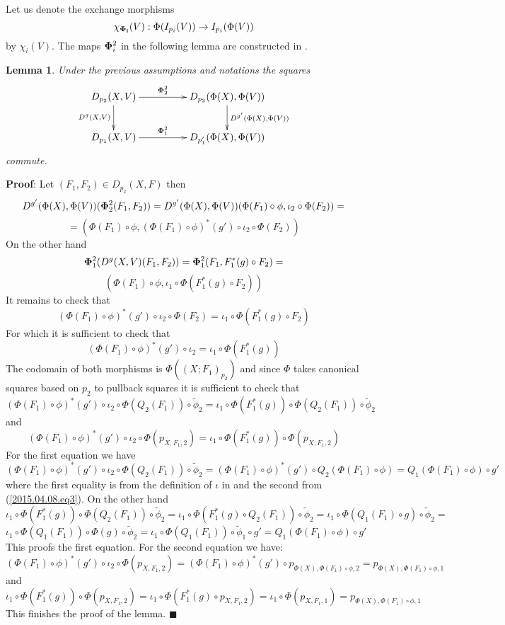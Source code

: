 \documentclass[12pt]{article}
\numberwithin{equation}{section}
\newenvironment{myproof}{{\bf Proof}:}{$\blacksquare$ \vskip 5mm }
\newtheorem{lemma}[proposition]{Lemma}
\newcommand{\llabel}[1]{\label{#1}}
\newcommand{\sr}{\rightarrow}
\newcommand{\wt}{\widetilde}
\begin{document}
%
Let us denote the exchange morphisms
%
$$\chi_{\bf\Phi_i}(V):\Phi(I_{p_i}(V))\sr I_{p_i}(\Phi(V))$$
%
by $\chi_i(V)$. The maps ${\bf\Phi}_i^2$ in the following lemma are constructed
in \cite[Construction 5.2]{fromunivwithPi}.
%
\begin{lemma}
\llabel{2015.04.08.l1} Under the previous assumptions and notations the squares
%
$$
\begin{xy}
          \xymatrix@C=4pc{ D_{p_2}(X,V) \ar[r]^-{{\bf\Phi}_2^2}
            \ar[d]_{D^g(X,V)} & D_{p_2}(\Phi(X),\Phi(V))
            \ar[d]^{D^{g'}(\Phi(X),\Phi(V))}\\ D_{p_1}(X,V)
            \ar[r]^-{{\bf\Phi}_1^2} & D_{p_1'}(\Phi(X),\Phi(V)) }
\end{xy}
$$
%
commute.
\end{lemma}
%
\begin{myproof}
Let $(F_1,F_2)\in D_{p_2}(X,F)$ then
%
$$D^{g'}(\Phi(X),\Phi(V))({\bf\Phi}_2^2(F_1,F_2))=D^{g'}(\Phi(X),\Phi(V))(\Phi(F_1)\circ
\phi, \iota_2\circ \Phi(F_2))=$$
$$=(\Phi(F_1)\circ \phi, (\Phi(F_1)\circ \phi)^*(g')\circ \iota_2\circ
\Phi(F_2))$$
%
On the other hand
%
$${\bf\Phi}_1^2(D^g(X,V)(F_1,F_2))={\bf\Phi}_1^2(F_1,F_1^*(g)\circ F_2)=$$
$$(\Phi(F_1)\circ\phi,\iota_1\circ \Phi(F_1^*(g)\circ F_2))$$
%
It remains to check that
%
$$(\Phi(F_1)\circ \phi)^*(g')\circ \iota_2\circ \Phi(F_2)=\iota_1\circ
\Phi(F_1^*(g)\circ F_2)$$
%
For which it is sufficient to check that
%
$$(\Phi(F_1)\circ \phi)^*(g')\circ \iota_2=\iota_1\circ \Phi(F_1^*(g))$$
%
The codomain of both morphisms is $\Phi((X;F_1)_{p_2})$ and since $\Phi$ takes
canonical squares based on $p_2$ to pullback squares it is sufficient to check
that
%
$$(\Phi(F_1)\circ \phi)^*(g')\circ \iota_2\circ
\Phi(Q_2(F_1))\circ\wt{\phi}_2=\iota_1\circ \Phi(F_1^*(g))\circ
\Phi(Q_2(F_1))\circ\wt{\phi}_2$$
%
and
%
$$(\Phi(F_1)\circ \phi)^*(g')\circ \iota_2\circ \Phi(p_{X,F_1,2})=\iota_1\circ
\Phi(F_1^*(g))\circ \Phi(p_{X,F_1,2})$$
%
For the first equation we have
%
$$(\Phi(F_1)\circ \phi)^*(g')\circ \iota_2\circ
\Phi(Q_2(F_1))\circ\wt{\phi}_2=(\Phi(F_1)\circ \phi)^*(g')\circ
Q_2(\Phi(F_1)\circ \phi)=Q_1(\Phi(F_1)\circ\phi)\circ g'$$
%
where the first equality is from the definition of $\iota$ in
\cite[Construction 5.2]{fromunivwithPi} and the second from
(\ref{2015.04.08.eq3}). On the other hand
%
$$\iota_1\circ \Phi(F_1^*(g))\circ
\Phi(Q_2(F_1))\circ\wt{\phi}_2=\iota_1\circ\Phi(F_1^*(g)\circ Q_2(F_1))\circ
\wt{\phi}_2=\iota_1\circ \Phi(Q_1(F_1)\circ g)\circ \wt{\phi}_2=$$
$$\iota_1\circ \Phi(Q_1(F_1))\circ \Phi(g)\circ \wt{\phi}_2=\iota_1\circ
\Phi(Q_1(F_1))\circ \wt{\phi}_1\circ g'=Q_1(\Phi(F_1)\circ \phi)\circ g'$$
%
This proofs the first equation. For the second equation we have:
%
$$(\Phi(F_1)\circ \phi)^*(g')\circ \iota_2\circ
\Phi(p_{X,F_1,2})=(\Phi(F_1)\circ \phi)^*(g')\circ
p_{\Phi(X),\Phi(F_1)\circ\phi,2}=p_{\Phi(X),\Phi(F_1)\circ\phi,1}$$
%
and
%
$$\iota_1\circ \Phi(F_1^*(g))\circ \Phi(p_{X,F_1,2})=\iota_1\circ
\Phi(F_1^*(g)\circ p_{X,F_1,2})=\iota_1\circ
\Phi(p_{X,F_1,1})=p_{\Phi(X),\Phi(F_1)\circ \phi,1}$$
%
This finishes the proof of the lemma.
\end{myproof}
\end{document}
